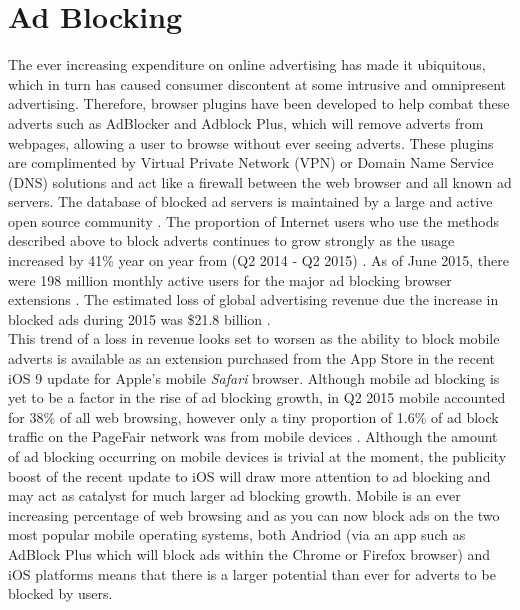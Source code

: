 \documentclass[12pt]{article}
\begin{document}
\section{Ad Blocking}
The ever increasing expenditure on online advertising has made it ubiquitous, which in turn has caused consumer discontent at some intrusive and omnipresent advertising. Therefore, browser plugins have been developed to help combat these adverts such as AdBlocker and Adblock Plus, which will remove adverts from webpages, allowing a user to browse without ever seeing adverts. These plugins are complimented by Virtual Private Network (VPN) or Domain Name Service (DNS) solutions and act like a firewall between the web browser and all known ad servers. The database of blocked ad servers is maintained by a large and active open source community \parencite{adobeAdBlock}. The proportion of Internet users who use the methods described above to block adverts continues to grow strongly as the usage increased by 41\% year on year from (Q2 2014 - Q2 2015) \parencite{adobeAdBlock}. As of June 2015, there were 198 million monthly active users for the major ad blocking browser extensions \parencite{adobeAdBlock}. The estimated loss of global advertising revenue due the increase in blocked ads during 2015 was \$21.8 billion \parencite{adobeAdBlock}. \\

This trend of a loss in revenue looks set to worsen as the ability to block mobile adverts is available as an extension purchased from the App Store in the recent iOS 9 update for Apple's mobile \textit{Safari} browser. Although mobile ad blocking is yet to be a factor in the rise of ad blocking growth, in Q2 2015 mobile accounted for 38\% of all web browsing, however only a tiny proportion of 1.6\% of ad block traffic on the PageFair network was from mobile devices \parencite{adobeAdBlock}. Although the amount of ad blocking occurring on mobile devices is trivial at the moment, the publicity boost of the recent update to iOS will draw more attention to ad blocking and may act as catalyst for  much larger ad blocking growth. Mobile is an ever increasing percentage of web browsing and as you can now block ads on the two most popular mobile operating systems, both Andriod (via an app such as AdBlock Plus which will block ads within the Chrome or Firefox browser) and iOS platforms means that there is a larger potential than ever for adverts to be blocked by users. \\
\end{document}
